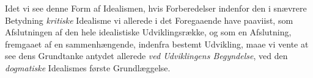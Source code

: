 Idet vi see denne Form af Idealismen, hvis Forberedelser
indenfor den i snævrere Betydning \emph{kritiske} Idealisme vi allerede
 i det Foregaaende have paaviist, som Afslutningen af den
hele idealistiske Udviklingsrække, og som en Afslutning, fremgaaet
af en sammenhængende, indenfra bestemt Udvikling,
maae vi vente at see dens Grundtanke antydet allerede \emph{ved
Udviklingens Begyndelse}, ved den \emph{dogmatiske} Idealismes
første Grundlæggelse.

